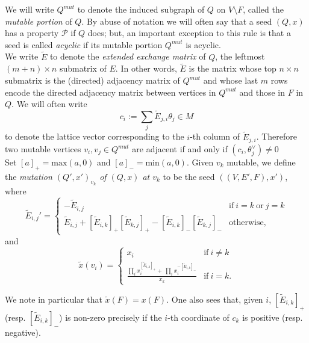 \documentclass[11pt]{amsart}
\theoremstyle{definition}
\theoremstyle{remark}
\numberwithin{equation}{section}
\begin{document}
We will write $Q^{mut}$ to denote the induced subgraph of $Q$ on $V \setminus F$, called the \textit{mutable portion} of $Q$. By abuse of notation we will often say that a seed $(Q, x)$ has a property $\mathcal{P}$ if $Q$ does; but, an important exception to this rule is that a seed is called \textit{acyclic} if its mutable portion $Q^{mut}$ is acyclic.\\

We write $\tilde{E}$ to denote the \textit{extended exchange matrix} of $Q$, the leftmost $(m+n) \times n$ submatrix of $E$. In other words, $\tilde{E}$ is the matrix whose top $n \times n$ submatrix is the (directed) adjacency matrix of $Q^{mut}$ and whose last $m$ rows encode the directed adjacency matrix between vertices in $Q^{mut}$ and those in $F$ in $Q$. We will often write \begin{equation}
    c_i := \sum_j \tilde{E}_{j,i} \theta_j \in M
\end{equation} to denote the lattice vector corresponding to the $i$-th column of $\tilde{E}_{j,i}$. Therefore two mutable vertices $v_i, v_j \in Q^{mut}$ are adjacent if and only if $(c_i, \theta_j^\vee) \neq 0$\\

Set $[a]_+ = \text{max}(a, 0)$ and $[a]_- = \text{min}(a, 0)$. Given $v_k$ mutable, we define the \textit{mutation $(Q', x')_{v_k}$ of $(Q, x)$ at $v_k$} to be the seed $((V, E', F), x')$, where
\begin{equation}
    \tilde{E}_{i,j}' =
    \begin{cases}
      -\tilde{E}_{i,j} & \text{if}\ i = k\:\text{or}\ j = k \\
      \tilde{E}_{i,j} + [\tilde{E}_{i,k}]_+[\tilde{E}_{k,j}]_+ - [\tilde{E}_{i,k}]_-[\tilde{E}_{k,j}]_- & \text{otherwise},
    \end{cases}
  \end{equation}
  \noindent and 
  \begin{equation}
  \tilde{x}(v_i) =
      \begin{cases}
      x_i & \text{if}\ i \neq k \\
      \frac{\prod_i x_i^{[\tilde{E}_{i,k}]_+} +\:\prod_i x_i^{-[\tilde{E}_{i,k}]_-}
      }{x_k}& \text{if}\ i = k.
    \end{cases}
  \end{equation}

We note in particular that $\tilde{x}(F) = x(F)$. One also sees that, given $i$, $[\tilde{E}_{i,k}]_+$ (resp. $[\tilde{E}_{i,k}]_-$) is non-zero precisely if the $i$-th coordinate of $c_k$ is positive (resp. negative).\\
\end{document}
